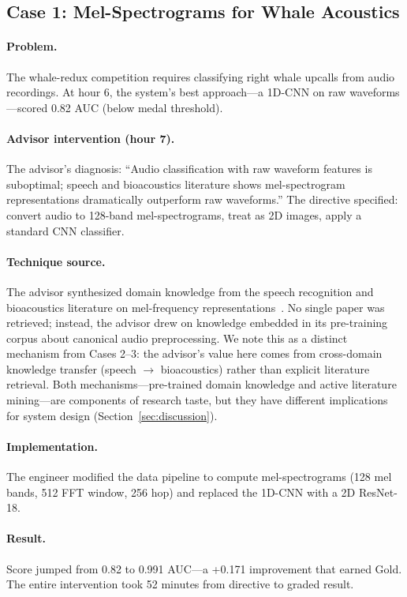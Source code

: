 \documentclass{article}
\begin{document}
\subsection{Case 1: Mel-Spectrograms for Whale Acoustics}
\label{sec:case_whale}

\paragraph{Problem.} The whale-redux competition requires classifying right whale upcalls from audio recordings. At hour 6, the system's best approach---a 1D-CNN on raw waveforms---scored 0.82 AUC (below medal threshold).

\paragraph{Advisor intervention (hour 7).} The advisor's diagnosis: ``Audio classification with raw waveform features is suboptimal; speech and bioacoustics literature shows mel-spectrogram representations dramatically outperform raw waveforms.'' The directive specified: convert audio to 128-band mel-spectrograms, treat as 2D images, apply a standard CNN classifier.

\paragraph{Technique source.} The advisor synthesized domain knowledge from the speech recognition and bioacoustics literature on mel-frequency representations~\citep{stevens1937mel}. No single paper was retrieved; instead, the advisor drew on knowledge embedded in its pre-training corpus about canonical audio preprocessing. We note this as a distinct mechanism from Cases 2--3: the advisor's value here comes from cross-domain knowledge transfer (speech $\to$ bioacoustics) rather than explicit literature retrieval. Both mechanisms---pre-trained domain knowledge and active literature mining---are components of research taste, but they have different implications for system design (Section~\ref{sec:discussion}).

\paragraph{Implementation.} The engineer modified the data pipeline to compute mel-spectrograms (128 mel bands, 512 FFT window, 256 hop) and replaced the 1D-CNN with a 2D ResNet-18.

\paragraph{Result.} Score jumped from 0.82 to 0.991 AUC---a +0.171 improvement that earned Gold. The entire intervention took 52 minutes from directive to graded result.
\end{document}
